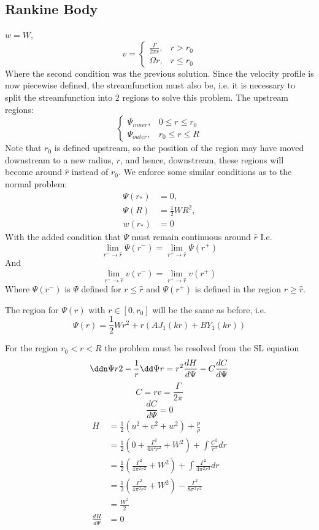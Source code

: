 \documentclass{X:/Documents/Coding/Latex/myreport}
\begin{document}
\subsection{Rankine Body}
$w = W$, 
\[v = \begin{cases}
    \frac{\Gamma}{{2 \pi r}}, &r > r_0 \\
\Omega r ,& r \leq r_0
\end{cases}  \]
Where the second condition was the previous solution. Since the velocity profile is now piecewise defined, the streamfunction must also be, i.e. it is necessary to split the streamfunction into 2 regions to solve this problem. The upstream regions:
 \[\begin{cases}
         \Psi_{inner}, & 0\leq r\leq r_0 \\
         \Psi_{outer}, & r_0\leq r\leq R
     \end{cases}
 \]
Note that $r_0$ is defined upstream, so the position of the region may have moved downstream to a new radius, $\hat{r}$, and hence, downstream, these regions will become around $\hat{r}$ instead of $r_0$. We enforce some similar conditions as to the normal problem:
\begin{align*}
    \Psi(r_*) &= 0, \\
    \Psi(R) &= \frac12 WR^2,\\
    w(r_*) &= 0
\end{align*}
With the added condition that $\Psi$ must remain continuous around $\hat{r}$
I.e.
\[\lim_{r^-\to \hat{r}} \Psi(r^-) = \lim_{r^+ \to \hat{r}} \Psi(r^+)\]
And
\[\lim_{r^- \to \hat{r}} v(r^-) = \lim_{r^+ \to \hat{r}} v(r^+)\]
Where $\Psi(r^-)$ is $\Psi$ defined for $r \leq \hat{r}$ and $\Psi(r^+)$ is defined in the region $r \geq \hat{r}$.

The region for $\Psi(r)$ with $r\in [0,r_0]$ will be the same as before, i.e.
\[\Psi(r) = \frac12 Wr^2 + r(AJ_1(kr) + BY_1(kr))\]

For the region $r_0<r<R$ the problem must be resolved from the SL equation
\[\ddn \Psi r 2 - \frac1r \dd\Psi r = r^2 \frac{dH}{d\Psi} - C \frac{dC}{d\Psi}\]
\[C = rv = \frac{\Gamma}{2\pi}\]
\[\frac{dC}{d\Psi} = 0\]
\begin{align*}
    H &= \frac12 (u^2 + v^2 + w^2) + \frac{p}{\rho}\\
    &= \frac12 (0 + \frac{\Gamma^2}{4\pi^2 r^2} + W^2) + \int \frac{C^2}{r^3} dr\\
    &=   \frac12 (\frac{\Gamma^2}{4\pi^2 r^2} + W^2) + \int \frac{\Gamma^2}{4 \pi^2r^3} dr\\
    &=   \frac12 (\frac{\Gamma^2}{4\pi^2 r^2} + W^2) -\frac{\Gamma^2}{8 \pi^2r^2} \\
    &= \frac{W^2}{2}\\
    \frac{dH}{d\Psi} &= 0
\end{align*}
\end{document}

